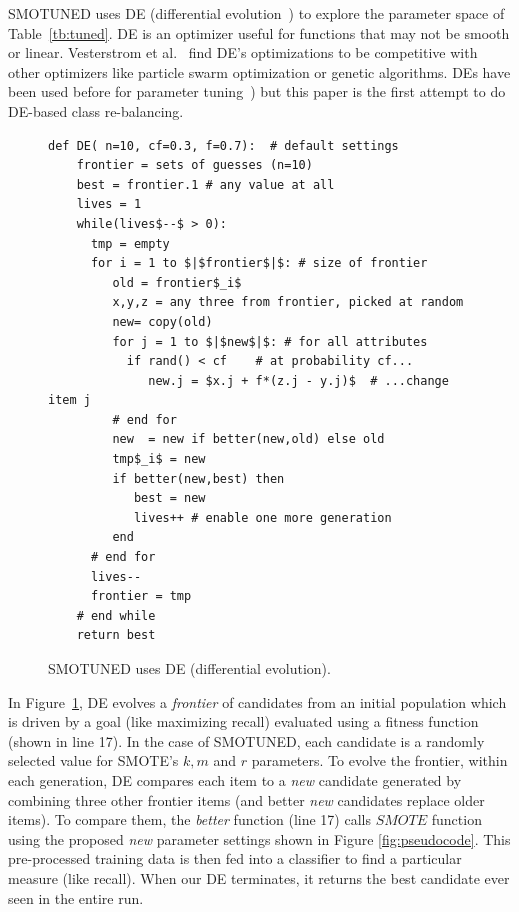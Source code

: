 \documentclass[sigconf,review, anonymous]{acmart}
\theoremstyle{break}
\theoremstyle{break}
\newcommand{\smb}{{\sc SMOTUNED}}
\begin{document}
 
{\smb} uses DE (differential evolution~\cite{storn1997differential}) to explore the parameter space of
Table~\ref{tb:tuned}.  DE is an
optimizer useful for functions that may not be smooth or linear.  Vesterstrom et al.~\cite{Vesterstrom04} find   DE's optimizations to be  competitive with other optimizers like 
   particle swarm optimization or genetic algorithms.
   DEs have been used before for   parameter tuning~\cite{omran2005differential, chiha2012tuning,fu2016tuning,fu2017easy, agrawal2016wrong}) but this paper is  the first attempt to do
   DE-based class re-balancing.

\begin{figure}[!b]
\begin{lstlisting}[mathescape,linewidth=8.2cm,frame=r,numbers=right]
  def DE( n=10, cf=0.3, f=0.7):  # default settings
    frontier = sets of guesses (n=10)
    best = frontier.1 # any value at all
    lives = 1
    while(lives$--$ > 0): 
      tmp = empty
      for i = 1 to $|$frontier$|$: # size of frontier
         old = frontier$_i$
         x,y,z = any three from frontier, picked at random
         new= copy(old)  
         for j = 1 to $|$new$|$: # for all attributes
           if rand() < cf    # at probability cf...
              new.j = $x.j + f*(z.j - y.j)$  # ...change item j
         # end for
         new  = new if better(new,old) else old
         tmp$_i$ = new 
         if better(new,best) then
            best = new
            lives++ # enable one more generation
         end                  
      # end for
      lives--
      frontier = tmp
    # end while
    return best
\end{lstlisting}
\caption{SMOTUNED uses DE (differential evolution).}
\label{fig:pseudo_DE} 
\end{figure}


In Figure~\ref{fig:pseudo_DE}, DE evolves a \textit{frontier} of
candidates from an initial population which is driven by a goal (like maximizing recall) evaluated using a fitness function (shown in line 17). In the case of {\smb},
each  candidate is a randomly selected value for SMOTE's $k, m$ and $r$ parameters.
 To evolve the frontier, within each generation,
 DE compares each item to a {\em new} candidate generated
 by combining three other frontier items (and better {\em new} candidates replace
 older items). 
 To compare them, the {\em better} function (line 17) calls $SMOTE$ function using the proposed {\em new} parameter settings shown in Figure \ref{fig:pseudocode}. This pre-processed training data is then fed into a classifier to find a particular measure (like recall).
 When our DE  terminates, it returns the best candidate ever seen in the entire run.
 
\end{document}

